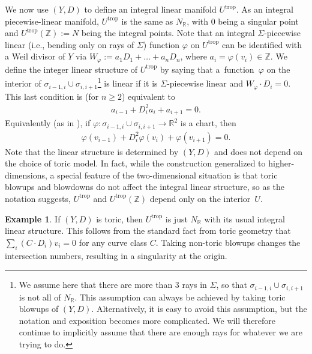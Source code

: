 \documentclass[10pt,a4paper]{amsart}
\numberwithin{equation}{section}
\numberwithin{figure}{section}
\numberwithin{table}{section}
\DeclareMathOperator{\trop}{trop}
\let\bb=\mathbb
\let\rar=\rightarrow
\theoremstyle{definition}
\newtheorem{eg}[thm]{Example}
\begin{document}
We now use $(Y,D)$ to define an integral linear manifold $U^{\trop}$. As an integral piecewise-linear manifold, $U^{\trop}$ is the same as $N_{\bb{R}}$, with $0$ being a singular point and $U^{\trop}(\bb{Z}):=N$ being the integral points.
 Note that an integral $\Sigma$-piecewise linear (i.e., bending only on rays of $\Sigma$) function $\varphi$ on $U^{\trop}$ can be identified with a Weil divisor of $Y$ via $W_{\varphi}:=a_1D_1+\dots + a_n D_n$, where $a_i = \varphi(v_i)\in \bb{Z}$. We define the integer linear structure of $U^{\trop}$ by saying that a~func\-tion~$\varphi$ on the interior of $\sigma_{i-1,i}\cup\sigma_{i,i+1}$\footnote{We assume here that there are more than $3$ rays in $\Sigma$, so that $\sigma_{i-1,i}\cup \sigma_{i,i+1}$ is not all of $N_{\bb{R}}$. This assumption can always be achieved by taking toric blowups of $(Y,D)$. Alternatively, it is easy to avoid this assumption, but the notation and exposition becomes more complicated. We will therefore continue to implicitly assume that there are enough rays for whatever we are trying to do.} is linear if it is $\Sigma$-piecewise linear and $W_\varphi \cdot D_{i} = 0$. This last condition is (for $n\geq 2$) equivalent to
\begin{gather*}
	a_{i-1} +D_{i}^2 a_{i} + a_{i+1} = 0.
\end{gather*}
Equivalently (as in \cite{GHK1}), if $\varphi\colon \sigma_{i-1,i}\cup \sigma_{i,i+1}\rar \bb{R}^2$ is a chart, then
\begin{gather} \label{linear}
	\varphi(v_{i-1})+D_{i}^2 \varphi(v_i) + \varphi(v_{i+1}) = 0.
\end{gather}
Note that the linear structure is determined by $(Y,D)$ and does not depend on the choice of toric model. In fact, while the construction generalized to higher-dimensions, a special feature of the two-dimensional situation is that toric blowups and blowdowns do not affect the integral linear structure, so as the notation suggests, $U^{\trop}$ and $U^{\trop}(\bb{Z})$ depend only on the interior~$U$.

\begin{eg}
If $(Y,D)$ is toric, then $U^{\trop}$ is just $N_{\bb{R}}$ with its usual integral linear structure. This follows from the standard fact from toric geometry that
$
	\sum_i (C \cdot D_i) v_i = 0
$
for any curve class $C$. Taking non-toric blowups changes the intersection numbers, resulting in a singularity at the origin.
\end{eg}
\end{document}
